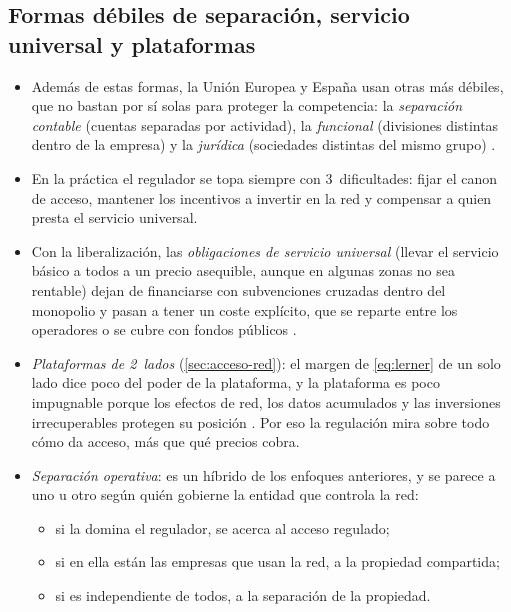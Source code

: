 \documentclass[11pt]{article}
\begin{document}
\subsection{Formas débiles de separación, servicio universal y plataformas}\label{anexo:separacion-debil}

\begin{itemize}
\item Además de estas formas, la Unión Europea y España usan otras más débiles, que no bastan por sí solas para proteger la competencia: la \emph{separación contable} (cuentas separadas por actividad), la \emph{funcional} (divisiones distintas dentro de la empresa) y la \emph{jurídica} (sociedades distintas del mismo grupo)\nocite{OCDE2001Restructuring,ArmstrongCowanVickers1994Regulatory} .
\item En la práctica el regulador se topa siempre con 3~dificultades: fijar el canon de acceso, mantener los incentivos a invertir en la red y compensar a quien presta el servicio universal.
\item Con la liberalización, las \emph{obligaciones de servicio universal} (llevar el servicio básico a todos a un precio asequible, aunque en algunas zonas no sea rentable) dejan de financiarse con subvenciones cruzadas dentro del monopolio y pasan a tener un coste explícito, que se reparte entre los operadores o se cubre con fondos públicos .
\item \emph{Plataformas de 2~lados} (\ref{sec:acceso-red}): el margen de  \eqref{eq:lerner} de un solo lado dice poco del poder de la plataforma, y la plataforma es poco impugnable porque los efectos de red, los datos acumulados y las inversiones irrecuperables protegen su posición . Por eso la regulación mira sobre todo cómo da acceso, más que qué precios cobra.
\item \emph{Separación operativa}: es un híbrido de los enfoques anteriores, y se parece a uno u otro según quién gobierne la entidad que controla la red:
  \begin{itemize}
  \item si la domina el regulador, se acerca al acceso regulado;
  \item si en ella están las empresas que usan la red, a la propiedad compartida;
  \item si es independiente de todos, a la separación de la propiedad\nocite{OCDE2001Restructuring}.
  \end{itemize}
\end{itemize}
\end{document}
